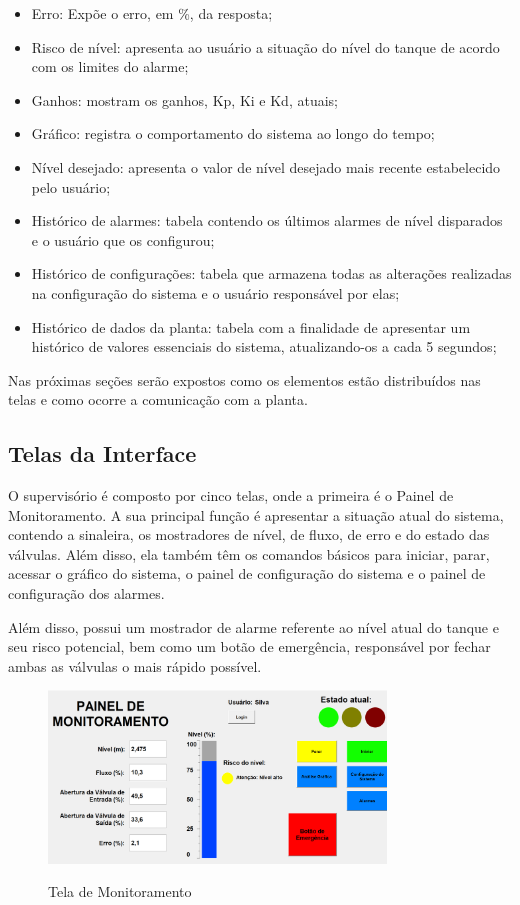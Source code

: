 \documentclass[
	article,			%
	11pt,				%
	oneside,			%
	a4paper,			%
	section=TITLE,		%
	english,			%
	brazil,				%
	sumario=tradicional
	]{abntex2}
\begin{document}
\begin{itemize}
\begin{itemize}
    \item Erro: Expõe o erro, em \%, da resposta;
    \item Risco de nível: apresenta ao usuário a situação do nível do tanque de acordo com os limites do alarme;
    \item Ganhos: mostram os ganhos, Kp, Ki e Kd, atuais;
    \item Gráfico: registra o comportamento do sistema ao longo do tempo;
    \item Nível desejado: apresenta o valor de nível desejado mais recente estabelecido pelo usuário;
    \item Histórico de alarmes: tabela contendo os últimos alarmes de nível disparados e o usuário que os configurou;
    \item Histórico de configurações: tabela que armazena todas as alterações realizadas na configuração do sistema e o usuário responsável por elas;
    \item Histórico de dados da planta: tabela com a finalidade de apresentar um histórico de valores essenciais do sistema, atualizando-os a cada 5 segundos;
\end{itemize}
\end{itemize}

Nas próximas seções serão expostos como os elementos estão distribuídos nas telas e como ocorre a comunicação com a planta.

\subsection{Telas da Interface}

O supervisório é composto por cinco telas, onde a primeira é o Painel de Monitoramento. A sua principal função é apresentar a situação atual do sistema, contendo a sinaleira, os mostradores de nível, de fluxo, de erro e do estado das válvulas. Além disso, ela também têm os comandos básicos para iniciar, parar, acessar o gráfico do sistema, o painel de configuração do sistema e o painel de configuração dos alarmes. 

Além disso, possui um mostrador de alarme referente ao nível atual do tanque e seu risco potencial, bem como um botão de emergência, responsável por fechar ambas as válvulas o mais rápido possível.

\begin{figure}[H]
    \centering
    \caption{Tela de Monitoramento} \includegraphics[width=0.8\textwidth]{img/ui_geral.png}
    \label{fig:tel1}
\end{figure}
\end{document}

